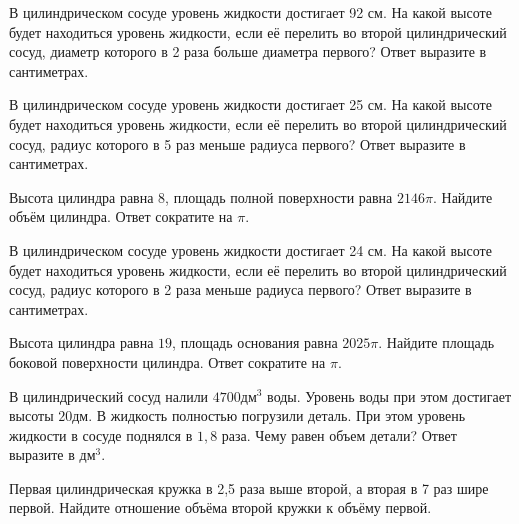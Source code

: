 \documentclass[4apaper]{article}
\begin{document}
\begin{taskBN}{57}
В цилиндрическом сосуде уровень жидкости достигает 92 см. На какой высоте будет находиться уровень жидкости, если её перелить во второй цилиндрический сосуд, диаметр которого в 2 раза больше диаметра первого? Ответ выразите в сантиметрах.
\end{taskBN}

\begin{taskBN}{58}
В цилиндрическом сосуде уровень жидкости достигает 25 см. На какой высоте будет находиться уровень жидкости, если её перелить во второй цилиндрический сосуд, радиус которого в 5 раз меньше радиуса первого? Ответ выразите в сантиметрах.
\end{taskBN}

\begin{taskBN}{59}
Высота цилиндра равна $8$, площадь полной поверхности равна $2146\pi$. Найдите объём цилиндра. Ответ сократите на $\pi$.
\end{taskBN}

\begin{taskBN}{60}
В цилиндрическом сосуде уровень жидкости достигает 24 см. На какой высоте будет находиться уровень жидкости, если её перелить во второй цилиндрический сосуд, радиус которого в 2 раза меньше радиуса первого? Ответ выразите в сантиметрах.
\end{taskBN}

\begin{taskBN}{61}
Высота цилиндра равна $19$, площадь основания равна $2025\pi$. Найдите площадь боковой поверхности цилиндра. Ответ сократите на $\pi$.
\end{taskBN}

\begin{taskBN}{62}
В цилиндрический сосуд налили $4700\mbox{дм}^3$ воды. Уровень воды при этом достигает высоты $20$дм. В жидкость полностью погрузили деталь. При этом уровень жидкости в сосуде поднялся в $ 1{,}8 $ раза. Чему равен объем детали? Ответ выразите в $\mbox{дм}^3$.
\end{taskBN}

\begin{taskBN}{63}
 Первая цилиндрическая кружка в 2,5 раза выше второй, а вторая в 7 раз шире первой. Найдите отношение объёма второй кружки к объёму первой.
\end{taskBN}
\end{document}
